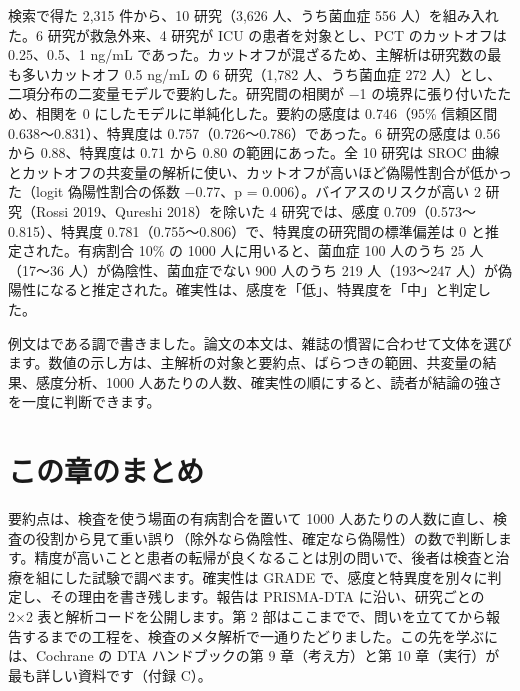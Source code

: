 \begin{KKfbox9ao}[例文]
検索で得た 2,315 件から、10 研究（3,626 人、うち菌血症 556 人）を組み入れた。6 研究が救急外来、4 研究が ICU の患者を対象とし、PCT のカットオフは 0.25、0.5、1 ng/mL であった。カットオフが混ざるため、主解析は研究数の最も多いカットオフ 0.5 ng/mL の 6 研究（1,782 人、うち菌血症 272 人）とし、二項分布の二変量モデルで要約した。研究間の相関が −1 の境界に張り付いたため、相関を 0 にしたモデルに単純化した。要約の感度は 0.746（95\% 信頼区間 0.638〜0.831）、特異度は 0.757（0.726〜0.786）であった。6 研究の感度は 0.56 から 0.88、特異度は 0.71 から 0.80 の範囲にあった。全 10 研究は SROC 曲線とカットオフの共変量の解析に使い、カットオフが高いほど偽陽性割合が低かった（logit 偽陽性割合の係数 −0.77、p = 0.006）。バイアスのリスクが高い 2 研究（Rossi 2019、Qureshi 2018）を除いた 4 研究では、感度 0.709（0.573〜0.815）、特異度 0.781（0.755〜0.806）で、特異度の研究間の標準偏差は 0 と推定された。有病割合 10\% の 1000 人に用いると、菌血症 100 人のうち 25 人（17〜36 人）が偽陰性、菌血症でない 900 人のうち 219 人（193〜247 人）が偽陽性になると推定された。確実性は、感度を「低」、特異度を「中」と判定した。
\end{KKfbox9ao}

例文はである調で書きました。論文の本文は、雑誌の慣習に合わせて文体を選びます。数値の示し方は、主解析の対象と要約点、ばらつきの範囲、共変量の結果、感度分析、1000 人あたりの人数、確実性の順にすると、読者が結論の強さを一度に判断できます。

\section{この章のまとめ}
\label{sec:15-5}

要約点は、検査を使う場面の有病割合を置いて 1000 人あたりの人数に直し、検査の役割から見て重い誤り（除外なら偽陰性、確定なら偽陽性）の数で判断します。精度が高いことと患者の転帰が良くなることは別の問いで、後者は検査と治療を組にした試験で調べます。確実性は GRADE で、感度と特異度を別々に判定し、その理由を書き残します。報告は PRISMA-DTA に沿い、研究ごとの 2×2 表と解析コードを公開します。第 2 部はここまでで、問いを立ててから報告するまでの工程を、検査のメタ解析で一通りたどりました。この先を学ぶには、Cochrane の DTA ハンドブックの第 9 章（考え方）と第 10 章（実行）が最も詳しい資料です（付録 C）。
